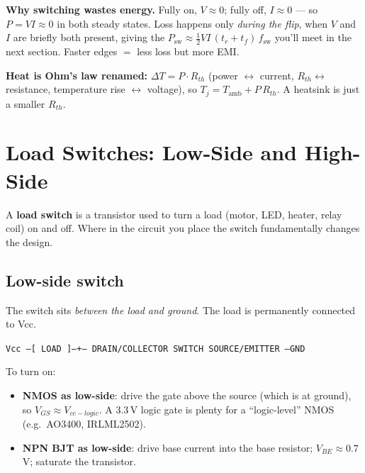 \documentclass[11pt,a4paper]{article}
\begin{document}
\textbf{Why switching wastes energy.} Fully on, $V\approx0$; fully off,
$I\approx0$ --- so $P=VI\approx0$ in both steady states. Loss happens only
\emph{during the flip}, when $V$ and $I$ are briefly both present, giving the
$P_{\text{sw}}\approx\frac12 VI\,(t_r+t_f)\,f_{\text{sw}}$ you'll meet in the
next section. Faster edges $=$ less loss but more EMI.

\begin{note}
\textbf{Heat is Ohm's law renamed:} $\Delta T = P\cdot R_{th}$ (power
$\leftrightarrow$ current, $R_{th}\leftrightarrow$ resistance, temperature
rise $\leftrightarrow$ voltage), so $T_j=T_{\text{amb}}+P\,R_{th}$. A heatsink
is just a smaller $R_{th}$.
\end{note}

\section{Load Switches: Low-Side and High-Side}

A \textbf{load switch} is a transistor used to turn a load (motor, LED,
heater, relay coil) on and off. Where in the circuit you place the
switch fundamentally changes the design.

\subsection{Low-side switch}

The switch sits \emph{between the load and ground}. The load is
permanently connected to Vcc.

\begin{center}
\texttt{Vcc ---[ LOAD ]---+--- DRAIN/COLLECTOR \;\; SWITCH \;\; SOURCE/EMITTER ---GND}
\end{center}

To turn on:
\begin{itemize}[leftmargin=*]
    \item \textbf{NMOS as low-side}: drive the gate above the source (which is
    at ground), so $V_{GS} \approx V_{cc-logic}$. A 3.3\,V logic gate is
    plenty for a ``logic-level'' NMOS (e.g.\ AO3400, IRLML2502).
    \item \textbf{NPN BJT as low-side}: drive base current into the base
    resistor; $V_{BE} \approx 0.7$\,V; saturate the transistor.
\end{itemize}
\end{document}
